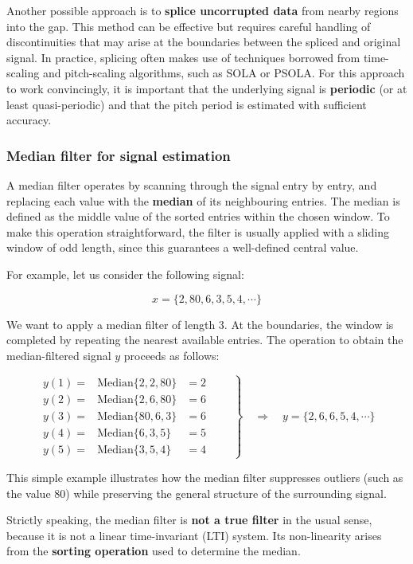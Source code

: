 Another possible approach is to \textbf{splice uncorrupted data} from nearby regions into the gap.  
This method can be effective but requires careful handling of discontinuities that may arise at the boundaries between the spliced and original signal.  
In practice, splicing often makes use of techniques borrowed from time-scaling and pitch-scaling algorithms, such as SOLA or PSOLA.
For this approach to work convincingly, it is important that the underlying signal is \textbf{periodic} (or at least quasi-periodic) and that the pitch period is estimated with sufficient accuracy.

\subsubsection{Median filter for signal estimation}
A median filter operates by scanning through the signal entry by entry, and replacing each value with the \textbf{median} of its neighbouring entries.  
The median is defined as the middle value of the sorted entries within the chosen window.  
To make this operation straightforward, the filter is usually applied with a sliding window of odd length, since this guarantees a well-defined central value.

For example, let us consider the following signal:

\[
x = \{2, 80, 6, 3, 5, 4, \cdots\}
\]

We want to apply a median filter of length 3.  
At the boundaries, the window is completed by repeating the nearest available entries.  
The operation to obtain the median-filtered signal $y$ proceeds as follows:

\[
\left.
\begin{array}{ccc}
y(1) =& \mathrm{Median}\{2,2,80\} &= 2 \\
y(2) =& \mathrm{Median}\{2,6,80\} &= 6 \\
y(3) =& \mathrm{Median}\{80,6,3\} &= 6 \\
y(4) =& \mathrm{Median}\{6,3,5\} &= 5 \\
y(5) =& \mathrm{Median}\{3,5,4\} &= 4
\end{array} \qquad
\right\} \quad \Rightarrow \quad
y = \{2, 6, 6, 5, 4, \cdots\}
\]

This simple example illustrates how the median filter suppresses outliers (such as the value $80$) while preserving the general structure of the surrounding signal.

Strictly speaking, the median filter is \textbf{not a true filter} in the usual sense, because it is not a linear time-invariant (LTI) system.
Its non-linearity arises from the \textbf{sorting operation} used to determine the median.

